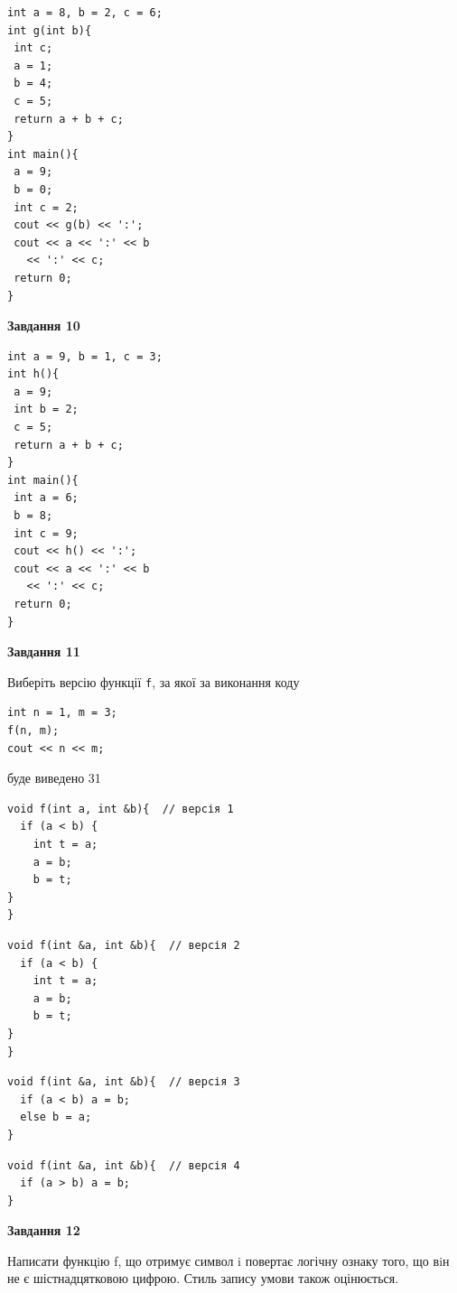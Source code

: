 \documentclass[12pt, ukrainian]{article}
\def\code#1{\Verb!#1!}
\begin{document}
{\begin {large}
\begin{minipage}[t]{7.0cm}
\begin{verbatim}
int a = 8, b = 2, c = 6;
int g(int b){
 int c;
 a = 1;
 b = 4;
 c = 5;
 return a + b + c;
}
int main(){
 a = 9;
 b = 0;
 int c = 2;
 cout << g(b) << ':';
 cout << a << ':' << b 
   << ':' << c;
 return 0;
}
\end{verbatim}



\begin{center}
\textbf{Завдання 10}
\end{center}
\vspace{-8mm}

\begin{verbatim}
int a = 9, b = 1, c = 3;
int h(){
 a = 9;
 int b = 2;
 c = 5;
 return a + b + c;
}
int main(){
 int a = 6;
 b = 8;
 int c = 9;
 cout << h() << ':';
 cout << a << ':' << b 
   << ':' << c;
 return 0;
}
\end{verbatim}

\end{minipage}
\vline \hspace{1mm}
\begin{minipage}[t]{11.0cm}

\begin{center}
\textbf{Завдання 11}
\end{center}
Виберіть версію функції \code{f}, за якої за виконання коду
\begin{verbatim}
int n = 1, m = 3;
f(n, m);
cout << n << m;
\end{verbatim}

буде виведено 31

\begin{verbatim}
void f(int a, int &b){  // версія 1
  if (a < b) {
    int t = a;
    a = b;
    b = t;
}  
}
\end{verbatim}

\vspace{-8mm}\begin{verbatim}
void f(int &a, int &b){  // версія 2
  if (a < b) {
    int t = a;
    a = b;
    b = t;
}  
}
\end{verbatim}

\vspace{-8mm}\begin{verbatim}
void f(int &a, int &b){  // версія 3
  if (a < b) a = b;
  else b = a;
}
\end{verbatim}

\vspace{-8mm}\begin{verbatim}
void f(int &a, int &b){  // версія 4
  if (a > b) a = b;
}
\end{verbatim}



\begin{center}
\textbf{Завдання 12}
\end{center}

Написати функцiю f, що отримує символ i повертає логічну ознаку того, що вiн не є шістнадцятковою цифрою. Стиль запису умови також оцінюється.\par

\end{minipage}

\end {large}}
\end{document}
